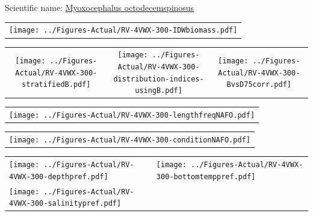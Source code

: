 \documentclass[12pt]{article}\usepackage[]{graphicx}\usepackage[]{color}
\begin{document}
Scientific name: \href{http://www.marinespecies.org/aphia.php?p=taxdetails\&id=159520}{Myoxocephalus octodecemspinosus} \newline
\begin{minipage}{1.0\textwidth}
 \begin{tabular}{c}
\texttt{[image: ../Figures-Actual/RV-4VWX-300-IDWbiomass.pdf]} \\ 
\end{tabular} 
\end{minipage}
\newline

\vspace{1cm}
\begin{minipage}{1.0\textwidth}
 \begin{tabular}{ccc}
\texttt{[image: ../Figures-Actual/RV-4VWX-300-stratifiedB.pdf]} & 
\texttt{[image: ../Figures-Actual/RV-4VWX-300-distribution-indices-usingB.pdf]} & 
\texttt{[image: ../Figures-Actual/RV-4VWX-300-BvsD75corr.pdf]} \\ 
\end{tabular} 
\end{minipage}
\clearpage
\begin{minipage}{1.0\textwidth}
 \begin{tabular}{c}
\texttt{[image: ../Figures-Actual/RV-4VWX-300-lengthfreqNAFO.pdf]} \\ 
\end{tabular} 
\end{minipage}
\newline

\vspace{1cm}
\begin{minipage}{1.0\textwidth}
 \begin{tabular}{c}
\texttt{[image: ../Figures-Actual/RV-4VWX-300-conditionNAFO.pdf]} \\ 
\end{tabular} 
\end{minipage}
\clearpage
\begin{minipage}{1.0\textwidth}
 \begin{tabular}[t]{m{3in}m{3in}}
\texttt{[image: ../Figures-Actual/RV-4VWX-300-depthpref.pdf]} & 
\texttt{[image: ../Figures-Actual/RV-4VWX-300-bottomtemppref.pdf]} \\ 
\texttt{[image: ../Figures-Actual/RV-4VWX-300-salinitypref.pdf]} & 
 \\ 
\end{tabular} 
\end{minipage}
\newline
\end{document}
